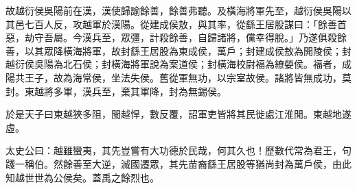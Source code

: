 \begin{pinyinscope}
故越衍侯吳陽前在漢，漢使歸諭餘善，餘善弗聽。及橫海將軍先至，越衍侯吳陽以其邑七百人反，攻越軍於漢陽。從建成侯敖，與其率，從繇王居股謀曰：「餘善首惡，劫守吾屬。今漢兵至，眾彊，計殺餘善，自歸諸將，儻幸得脫。」乃遂俱殺餘善，以其眾降橫海將軍，故封繇王居股為東成侯，萬戶；封建成侯敖為開陵侯；封越衍侯吳陽為北石侯；封橫海將軍說為案道侯；封橫海校尉福為繚嫈侯。福者，成陽共王子，故為海常侯，坐法失侯。舊從軍無功，以宗室故侯。諸將皆無成功，莫封。東越將多軍，漢兵至，棄其軍降，封為無錫侯。

於是天子曰東越狹多阻，閩越悍，數反覆，詔軍吏皆將其民徙處江淮閒。東越地遂虛。

太史公曰：越雖蠻夷，其先豈嘗有大功德於民哉，何其久也！歷數代常為君王，句踐一稱伯。然餘善至大逆，滅國遷眾，其先苗裔繇王居股等猶尚封為萬戶侯，由此知越世世為公侯矣。蓋禹之餘烈也。


\end{pinyinscope}
